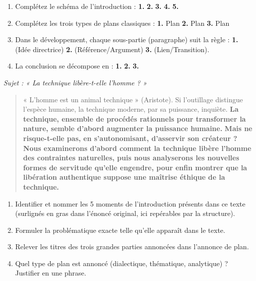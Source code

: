 \documentclass[11pt]{article}
\begin{document}
\begin{exercice}
\begin{enumerate}
    \item Complétez le schéma de l'introduction : \textbf{1.} \dotfill \quad \textbf{2.} \dotfill \quad \textbf{3.} \dotfill \quad \textbf{4.} \dotfill \quad \textbf{5.} \dotfill
    \item Complétez les trois types de plans classiques : \textbf{1.} Plan \dotfill \quad \textbf{2.} Plan \dotfill \quad \textbf{3.} Plan \dotfill
    \item Dans le développement, chaque sous-partie (paragraphe) suit la règle : \textbf{1.} \dotfill (Idée directrice) \quad \textbf{2.} \dotfill (Référence/Argument) \quad \textbf{3.} \dotfill (Lien/Transition).
    \item La conclusion se décompose en : \textbf{1.} \dotfill \quad \textbf{2.} \dotfill \quad \textbf{3.} \dotfill
\end{enumerate}
\end{exercice}

\begin{exercice}
\textit{Sujet : « La technique libère-t-elle l'homme ? »}

\begin{quote}
« L'homme est un animal technique » (Aristote). Si l'outillage distingue l'espèce humaine, la technique moderne, par sa puissance, inquiète. \textbf{La technique, ensemble de procédés rationnels pour transformer la nature, semble d'abord augmenter la puissance humaine.} \textbf{Mais ne risque-t-elle pas, en s'autonomisant, d'asservir son créateur ?} \textbf{Nous examinerons d'abord comment la technique libère l'homme des contraintes naturelles, puis nous analyserons les nouvelles formes de servitude qu'elle engendre, pour enfin montrer que la libération authentique suppose une maîtrise éthique de la technique.}
\end{quote}
\begin{enumerate}
    \item Identifier et nommer les 5 moments de l'introduction présents dans ce texte (surlignés en gras dans l'énoncé original, ici repérables par la structure).
    \item Formuler la problématique exacte telle qu'elle apparaît dans le texte.
    \item Relever les titres des trois grandes parties annoncées dans l'annonce de plan.
    \item Quel type de plan est annoncé (dialectique, thématique, analytique) ? Justifier en une phrase.
\end{enumerate}
\end{exercice}
\end{document}
